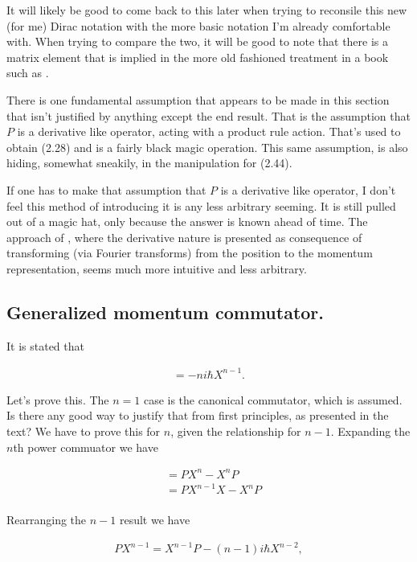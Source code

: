 It will likely be good to come back to this later when trying to reconsile this new (for me) Dirac notation with the more basic notation I'm already comfortable with.  When trying to compare the two, it will be good to note that there is a matrix element that is implied in the more old fashioned treatment in a book such as \cite{bohm1989qt}.

There is one fundamental assumption that appears to be made in this section that isn't justified by anything except the end result.  That is the assumption that $P$ is a derivative like operator, acting with a product rule action.  That's used to obtain (2.28) and is a fairly black magic operation.  This same assumption, is also hiding, somewhat sneakily, in the manipulation for (2.44).

If one has to make that assumption that $P$ is a derivative like operator, I don't feel this method of introducing it is any less arbitrary seeming.  It is still pulled out of a magic hat, only because the answer is known ahead of time.  The approach of \cite{bohm1989qt}, where the derivative nature is presented as consequence of transforming (via Fourier transforms) from the position to the momentum representation, seems much more intuitive and less arbitrary.

\subsection{Generalized momentum commutator.}

It is stated that

\begin{align*}
[P,X^n] = - n i \hbar X^{n-1}.
\end{align*}

Let's prove this.  The $n=1$ case is the canonical commutator, which is assumed.  Is there any good way to justify that from first principles, as presented in the text?  We have to prove this for $n$, given the relationship for $n-1$.  Expanding the $n$th power commuator we have

\begin{align*}
[P,X^n] 
&= P X^n - X^n P \\
&= P X^{n-1} X - X^{n } P \\
\end{align*}

Rearranging the $n-1$ result we have

\begin{align*}
P X^{n-1} = X^{n-1} P - (n-1) i \hbar X^{n-2},
\end{align*}

